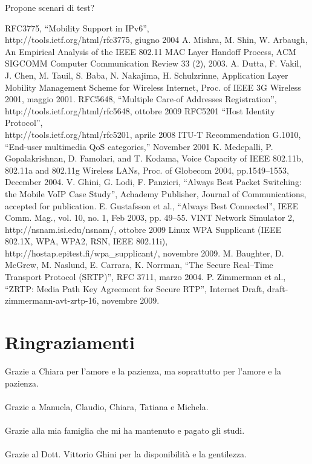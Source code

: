\documentclass[12pt,a4paper,openright,twoside,draft]{book}
\begin{document}
Propone scenari di test?

\clearpage{\pagestyle{empty}\cleardoublepage}


\begin{thebibliography}{90}
\rhead[\fancyplain{}{\bfseries \leftmark}]{\fancyplain{}{\bfseries
\thepage}}
 RFC3775, ``Mobility Support in IPv6'',\\
  http://tools.ietf.org/html/rfc3775, giugno 2004
 A. Mishra, M. Shin, W. Arbaugh, An
  Empirical Analysis of the IEEE 802.11 MAC Layer Handoff Process, ACM
  SIGCOMM Computer Communication Review 33 (2), 2003.
 A. Dutta, F. Vakil, J. Chen,
  M. Tauil, S. Baba, N. Nakajima, H.  Schulzrinne, Application Layer
  Mobility Management Scheme for Wireless Internet, Proc. of IEEE 3G
  Wireless 2001, maggio 2001.
 RFC5648, ``Multiple Care-of Addresses
  Registration'',\\http://tools.ietf.org/html/rfc5648, ottobre 2009
 RFC5201 ``Host Identity Protocol'',\\
  http://tools.ietf.org/html/rfc5201, aprile 2008
 ITU-T Recommendation G.1010, “End-user multimedia
  QoS categories,” November 2001
 K. Medepalli, P. Gopalakrishnan, D. Famolari,
  and T. Kodama, Voice Capacity of IEEE 802.11b, 802.11a and 802.11g
  Wireless LANs, Proc. of Globecom 2004, pp.1549–1553, December 2004.
 V. Ghini, G. Lodi, F. Panzieri, ``Always Best
  Packet Switching: the Mobile VoIP Case Study'', Achademy Publisher,
  Journal of Communications, accepted for publication.
 E. Gustafsson et al., ``Always Best Connected'',
  IEEE Comm. Mag., vol. 10, no. 1, Feb 2003, pp. 49--55.
 VINT Network Simulator 2,
  http://nsnam.isi.edu/nsnam/, ottobre 2009
 Linux WPA Supplicant (IEEE 802.1X, WPA,
  WPA2, RSN, IEEE 802.11i), http://hostap.epitest.fi/wpa\_supplicant/,
  novembre 2009.
 M. Baughter, D. McGrew, M. Naslund, E. Carrara,
  K. Norrman, ``The Secure Real--Time Transport Protocol (SRTP)'', RFC
  3711, marzo 2004.
 P. Zimmerman et al., ``ZRTP: Media Path Key
  Agreement for Secure RTP'', Internet Draft,
  draft-zimmermann-avt-zrtp-16, novembre 2009.
\end{thebibliography}

\clearpage{\pagestyle{empty}\cleardoublepage}

\chapter*{Ringraziamenti}
\thispagestyle{empty}

\noindent Grazie a Chiara per l'amore e la pazienza, ma soprattutto
per l'amore e la pazienza.\\\\Grazie a Manuela, Claudio, Chiara,
Tatiana e Michela.\\\\Grazie alla mia famiglia che mi ha mantenuto e
pagato gli studi.\\\\Grazie al Dott. Vittorio Ghini per la
disponibilità e la gentilezza.
\end{document}
